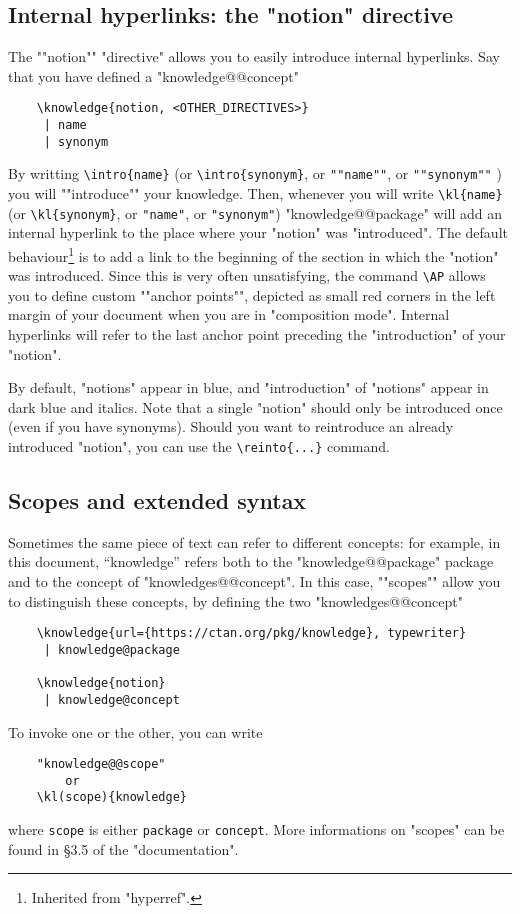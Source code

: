 \documentclass{article}
\begin{document}
\subsection{Internal hyperlinks: the "notion" directive}

The ""notion"" "directive" allows you to easily introduce internal hyperlinks.
Say that you have defined a "knowledge@@concept"
\begin{verbatim}
    \knowledge{notion, <OTHER_DIRECTIVES>}
     | name
     | synonym
\end{verbatim}
By writting \verb|\intro{name}| (or
\verb|\intro{synonym}|, or 
%
\verb|""name""|, or \verb|""synonym""|%
) you will \AP""introduce"" your knowledge. Then, whenever you will write
\verb|\kl{name}| (or
\verb|\kl{synonym}|, or 
%
\verb|"name"|, or \verb|"synonym"|)%
"knowledge@@package" will add an internal hyperlink to the place where
your "notion" was "introduced". The default behaviour\footnote{Inherited from
"hyperref".} is to add a link to the beginning of the section in which the "notion" was introduced. Since this is very often unsatisfying, the command
\verb|\AP| allows you to define custom \AP""anchor points"", depicted as 
small red corners in the left margin of your document when you are in "composition mode".
Internal hyperlinks 
will refer to the last anchor point preceding the "introduction" of your 
"notion".

By default, "notions" appear in blue, and "introduction" of "notions"
appear in dark blue and italics.
Note that a single "notion" should only be introduced once (even if you have synonyms). Should you want to reintroduce an already introduced "notion", 
you can use the \verb|\reinto{...}| command. 

\subsection{Scopes and extended syntax}

Sometimes the same piece of text can refer to different concepts: for example, in this document, ``knowledge'' refers both to the "knowledge@@package" package
and to the concept of "knowledges@@concept". In this case, \AP""scopes"" allow 
you to distinguish these concepts, by defining the two "knowledges@@concept"
\begin{verbatim}
    \knowledge{url={https://ctan.org/pkg/knowledge}, typewriter}
     | knowledge@package

    \knowledge{notion}
     | knowledge@concept
\end{verbatim}
To invoke one or the other, you can write
%
\begin{verbatim}
    "knowledge@@scope"
        or
    \kl(scope){knowledge}
\end{verbatim}
%
where \verb|scope| is either \verb|package| or
\verb|concept|.
More informations on "scopes" can be found in §3.5 of the "documentation".
\end{document}

